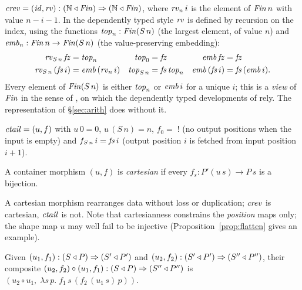 \documentclass{fundam}
\begin{document}
\begin{example}[Reverse]\label{ex:rev}
  $\mathit{crev} = (\mathit{id}, \mathit{rv}) : (\mathbb{N} \triangleleft \mathit{Fin}) \Rightarrow (\mathbb{N} \triangleleft \mathit{Fin})$,
  where $\mathit{rv}_n\,i$ is the element of $\mathit{Fin}\,n$ with value $n - i - 1$.  In the
  dependently typed style $\mathit{rv}$ is defined by recursion on the index, using the
  functions $\mathit{top}_n : \mathit{Fin}(S\,n)$ (the largest element, of value $n$) and
  $\mathit{emb}_n : \mathit{Fin}\,n \to \mathit{Fin}(S\,n)$ (the value-preserving embedding):
  \begin{align*}
    \mathit{rv}_{S\,n}\,\mathit{fz} &= \mathit{top}_n &
    \mathit{top}_0 &= \mathit{fz} & \mathit{emb}\,\mathit{fz} &= \mathit{fz}\\
    \mathit{rv}_{S\,n}\,(\mathit{fs}\,i) &= \mathit{emb}\,(\mathit{rv}_n\,i) &
    \mathit{top}_{S\,n} &= \mathit{fs}\,\mathit{top}_n & \mathit{emb}\,(\mathit{fs}\,i) &= \mathit{fs}\,(\mathit{emb}\,i).
  \end{align*}
  Every element of $\mathit{Fin}(S\,n)$ is either $\mathit{top}_n$ or $\mathit{emb}\,i$ for a unique $i$;
  this is a \emph{view} of $\mathit{Fin}$ in the sense of \cite{McBride00,McBrideMcKinna04}, on
  which the dependently typed developments of \cite{PrinceGhaniMcBride08,Prince10} rely.
  The representation of \S\ref{sec:arith} does without it.
\end{example}

\begin{example}[Tail]\label{ex:tail}
  $\mathit{ctail} = (u, f)$ with $u\,0 = 0$, $u\,(S\,n) = n$, $f_0 = \;!$ (no output
  positions when the input is empty) and $f_{S\,n}\,i = \mathit{fs}\,i$ (output position $i$
  is fetched from input position $i + 1$).
\end{example}

\begin{definition}\label{def:cartesian}
  A container morphism $(u,f)$ is \emph{cartesian} if every $f_s : P'(u\,s) \to P\,s$ is a
  bijection.
\end{definition}

A cartesian morphism rearranges data without loss or duplication; $\mathit{crev}$ is
cartesian, $\mathit{ctail}$ is not.  Note that cartesianness constrains the \emph{position}
maps only; the shape map $u$ may well fail to be injective
(Proposition~\ref{prop:flatten} gives an example).

\begin{definition}[Composition]\label{def:comp}
  Given $(u_1, f_1) : (S \triangleleft P) \Rightarrow (S' \triangleleft P')$ and
  $(u_2, f_2) : (S' \triangleleft P') \Rightarrow (S'' \triangleleft P'')$, their composite
  $(u_2, f_2) \circ (u_1, f_1) : (S \triangleleft P) \Rightarrow (S'' \triangleleft P'')$ is
  $(u_2 \circ u_1,\; \lambda s\,p.\; f_1\,s\,(f_2\,(u_1\,s)\,p))$.
\end{definition}
\end{document}
